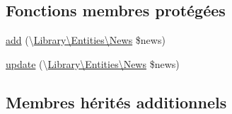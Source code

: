 \subsection*{Fonctions membres protégées}
\begin{DoxyCompactItemize}
\item 
\hyperlink{class_library_1_1_models_1_1_news_manager_a79bc3925eb60247d6d2c257530a456cd}{add} (\textbackslash{}\hyperlink{class_library_1_1_entities_1_1_news}{Library\textbackslash{}\+Entities\textbackslash{}\+News} \$news)
\item 
\hyperlink{class_library_1_1_models_1_1_news_manager_a13c8853d35aa529262e781338d8ac3f6}{update} (\textbackslash{}\hyperlink{class_library_1_1_entities_1_1_news}{Library\textbackslash{}\+Entities\textbackslash{}\+News} \$news)
\end{DoxyCompactItemize}
\subsection*{Membres hérités additionnels}


